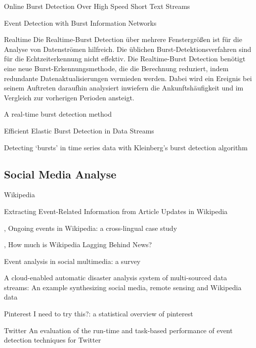 Online Burst Detection Over High Speed Short Text Streams
\cite{yuan2007online}


Event Detection with Burst Information Networks
\cite{ge2016event}

Realtime
Die Realtime-Burst Detection über mehrere Fenstergrößen ist für die Analyse von Datenströmen hilfreich. Die üblichen Burst-Detektionsverfahren sind für die Echtzeiterkennung nicht effektiv. Die Realtime-Burst Detection benötigt eine neue Burst-Erkennungsmethode, die die Berechnung reduziert, indem redundante Datenaktualisierungen vermieden werden. Dabei wird ein Ereignis bei seinem Auftreten daraufhin analysiert inwiefern die Ankunftshäufigkeit und im Vergleich zur vorherigen Perioden ansteigt.

\cite{ebina2011real}
A real-time burst detection method

Efficient Elastic Burst Detection in Data Streams 
\cite{Zhu:2003:EEB:956750.956789}

Detecting ‘bursts’ in time series data with Kleinberg’s burst detection algorithm
\cite{kleinberg1}

\subsection{Social Media Analyse}

Wikipedia

Extracting Event-Related Information from
Article Updates in Wikipedia
\cite{10.1007978-3-642-36973-5_22}


\cite{gottschalk2017ongoing},
  Ongoing events in Wikipedia: a cross-lingual case study

\cite{fetahu2015much},
  How much is Wikipedia Lagging Behind News?

\cite{liu2016event}
  Event analysis in social multimedia: a survey

A cloud-enabled automatic disaster analysis system of multi-sourced data streams: An example synthesizing social media, remote sensing and Wikipedia data
\cite{huang2017cloud}

Pinterest
I need to try this?: a statistical overview of pinterest
\cite{gilbert2013need}

Twitter
An evaluation of the run-time and task-based performance of event detection techniques for Twitter
\cite{weiler2016evaluation}
